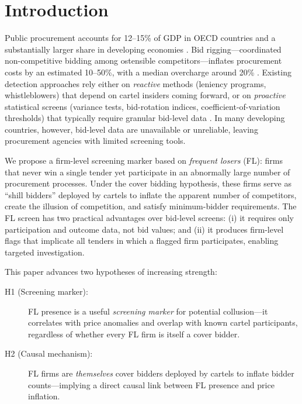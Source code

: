 \section{Introduction}
\label{sec:intro}

Public procurement accounts for 12--15\% of GDP in OECD countries and a
substantially larger share in developing economies
\citep{oecd2019government}. Bid rigging---coordinated non-competitive
bidding among ostensible competitors---inflates procurement costs by an
estimated 10--50\%, with a median overcharge around 20\%
\citep{connor2007price}. Existing detection approaches rely either on
\emph{reactive} methods (leniency programs, whistleblowers) that depend
on cartel insiders coming forward, or on \emph{proactive} statistical
screens (variance tests, bid-rotation indices, coefficient-of-variation
thresholds) that typically require granular bid-level data
\citep{harrington2008detecting, imhof2019detecting}. In many developing
countries, however, bid-level data are unavailable or unreliable, leaving
procurement agencies with limited screening tools.

We propose a firm-level screening marker based on
\emph{frequent losers} (FL): firms that never win a single tender yet
participate in an abnormally large number of procurement processes. Under
the cover bidding hypothesis, these firms serve as ``shill bidders''
deployed by cartels to inflate the apparent number of competitors, create
the illusion of competition, and satisfy minimum-bidder requirements. The
FL screen has two practical advantages over bid-level screens: (i) it
requires only participation and outcome data, not bid values; and (ii)
it produces firm-level flags that implicate all tenders in which a
flagged firm participates, enabling targeted investigation.

This paper advances two hypotheses of increasing strength:

\begin{description}
  \item[H1 (Screening marker):] FL presence is a useful \emph{screening
    marker} for potential collusion---it correlates with price anomalies
    and overlap with known cartel participants, regardless of whether
    every FL firm is itself a cover bidder.
  \item[H2 (Causal mechanism):] FL firms are \emph{themselves} cover
    bidders deployed by cartels to inflate bidder counts---implying a
    direct causal link between FL presence and price inflation.
\end{description}


